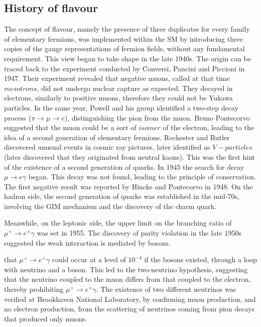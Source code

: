 \subsection{History of flavour}
The concept of flavour, namely the presence of three 
duplicates for every family of elementary fermions, was implemented within the SM by introducing 
three copies of the gauge representations of fermion fields, without any fundamental requirement. This view began 
to take shape in the late 1940s. The origin can be traced back to the 
experiment conducted by Conversi, Pancini and Piccioni in 1947. Their experiment 
revealed that negative muons, called at that time $mesotrons$, did not 
undergo nuclear capture as expected. They decayed in electrons, similarly to positive muons, 
therefore they could not be Yukawa particles. In the same year, 
Powell and his group identified a two-step decay process ($\pi \rightarrow \mu \rightarrow e$), 
distinguishing the pion from the muon. Bruno Pontecorvo suggested 
that the muon could be a sort of $isomer$ of the electron, leading to the idea of a second 
generation of elementary fermions. Rochester and Butler discovered 
unusual events in cosmic ray pictures, later identified as 
$V-particles$ (later discovered that they originated from neutral kaons). This was 
the first hint of the existence of a second generation of quarks. 
In 1945 the search for decay $\mu \rightarrow e \gamma$ began. This decay was not found, 
leading to the principle of  conservation. The first negative 
result was reported by Hincks and Pontecorvo in 1948. 
On the hadron side, the second generation of quarks was established in the mid-70s, 
involving the GIM mechanism and the discovery of the charm quark.

Meanwhile, on the leptonic side, the upper limit on the 
branching ratio of $\mu^+ \rightarrow  e^+ \gamma$  was set in 1955.
The discovery of parity violation 
in the late 1950s suggested the weak interaction is 
mediated by bosons. 

that $\mu^+ \rightarrow  e^+ \gamma$ could occur 
at a level of $10^{-4}$ if the bosons existed, through a 
loop with neutrino and a boson. This led to the two-neutrino hypothesis, suggesting that 
the neutrino coupled to the muon differs from that coupled to 
the electron, thereby prohibiting $\mu^+ \rightarrow  e^+ \gamma$. The existence of 
two different neutrinos was verified at Brookhaven National Laboratory, by
confirming muon production, and no electron production, from the scattering of neutrinos
coming from pion decays that produced only muons.

